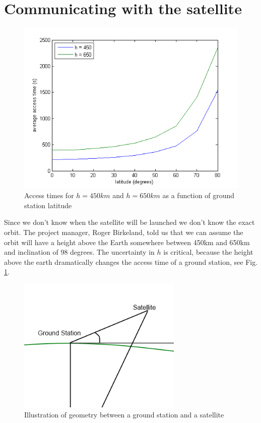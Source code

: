 \section{Communicating with the satellite}

\begin{figure}
  \begin{center}
    \includegraphics[width=1.0\textwidth]{Figures/accesstid450og650}
  \end{center}
  \caption[Accesstid for 450 og 650]{Access times for $h=450km$ and $h=650km$ as a function of ground station latitude}
  \label{fig:acctid}
\end{figure}

Since we don't know when the satellite will be launched we don't know the exact orbit. The project manager, Roger Birkeland, told us that we can assume the orbit will  have a height above the Earth somewhere between 450km and 650km and inclination of 98 degrees. The uncertainty in $h$ is critical, because the height above the earth dramatically changes the access time of a ground station, see Fig. \ref{fig:acctid}. 

\begin{figure}
  \begin{center}
    \includegraphics[width=0.7\textwidth]{Figures/groundstation_satelitte_geometry}
  \end{center}
  \caption[Ground station satellite geometry]{Illustration of geometry between a ground station and a satellite}
  \label{fig:gs_s_geom}
\end{figure}

